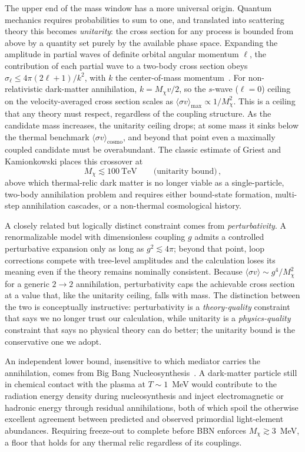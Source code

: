 The upper end of the mass window has a more universal origin.
Quantum mechanics requires probabilities to sum to one, and translated into scattering theory this becomes \emph{unitarity}: the cross section for any process is bounded from above by a quantity set purely by the available phase space.
Expanding the amplitude in partial waves of definite orbital angular momentum $\ell$, the contribution of each partial wave to a two-body cross section obeys $\sigma_\ell \leq 4\pi (2\ell+1)/k^2$, with $k$ the center-of-mass momentum~\cite{Griest:1989wd}.
For non-relativistic dark-matter annihilation, $k = M_\chi v /2$, so the $s$-wave ($\ell = 0$) ceiling on the velocity-averaged cross section scales as $\langle \sigma v \rangle_\mathrm{max} \propto 1/M_\chi^2$.
This is a ceiling that any theory must respect, regardless of the coupling structure.
As the candidate mass increases, the unitarity ceiling drops; at some mass it sinks below the thermal benchmark $\langle \sigma v \rangle_\mathrm{cosmo}$, and beyond that point even a maximally coupled candidate must be overabundant.
The classic estimate of Griest and Kamionkowski places this crossover at~\cite{Griest:1989wd}
\begin{equation}
	M_\chi \lesssim 100~\mathrm{TeV} \qquad \text{(unitarity bound)}\,,
	\label{eq:unitarity}
\end{equation}
above which thermal-relic dark matter is no longer viable as a single-particle, two-body annihilation problem and requires either bound-state formation, multi-step annihilation cascades, or a non-thermal cosmological history.

A closely related but logically distinct constraint comes from \emph{perturbativity}.
A renormalizable model with dimensionless coupling $g$ admits a controlled perturbative expansion only as long as $g^2 \lesssim 4\pi$; beyond that point, loop corrections compete with tree-level amplitudes and the calculation loses its meaning even if the theory remains nominally consistent.
Because $\langle \sigma v \rangle \sim g^4 / M_\chi^2$ for a generic $2\to 2$ annihilation, perturbativity caps the achievable cross section at a value that, like the unitarity ceiling, falls with mass.
The distinction between the two is conceptually instructive: perturbativity is a \emph{theory-quality} constraint that says we no longer trust our calculation, while unitarity is a \emph{physics-quality} constraint that says no physical theory can do better; the unitarity bound is the conservative one we adopt.

An independent lower bound, insensitive to which mediator carries the annihilation, comes from Big Bang Nucleosynthesis~\cite{Nollett:2014lwa}.
A dark-matter particle still in chemical contact with the plasma at $T \sim 1$~MeV would contribute to the radiation energy density during nucleosynthesis and inject electromagnetic or hadronic energy through residual annihilations, both of which spoil the otherwise excellent agreement between predicted and observed primordial light-element abundances.
Requiring freeze-out to complete before BBN enforces $M_\chi \gtrsim 3$~MeV, a floor that holds for any thermal relic regardless of its couplings.

